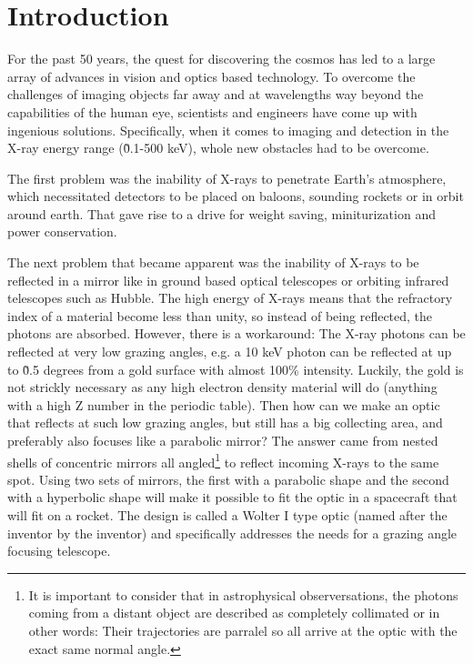 \chapter{Introduction}
For the past 50 years, the quest for discovering the cosmos has led to a large array of advances in vision and optics based technology. To overcome the challenges of imaging objects far away and at wavelengths way beyond the capabilities of the human eye, scientists and engineers have come up with ingenious solutions. Specifically, when it comes to imaging and detection in the X-ray energy range (\~0.1-500 keV), whole new obstacles had to be overcome.

The first problem was the inability of X-rays to penetrate Earth's atmosphere, which necessitated detectors to be placed on baloons, sounding rockets or in orbit around earth. That gave rise to a drive for weight saving, miniturization and power conservation.

The next problem that became apparent was the inability of X-rays to be reflected in a mirror like in ground based optical telescopes or orbiting infrared telescopes such as Hubble. The high energy of X-rays means that the refractory index of a material become less than unity, so instead of being reflected, the photons are absorbed. However, there is a workaround: The X-ray photons can be reflected at very low grazing angles, e.g. a 10 keV photon can be reflected at up to \~0.5 degrees from a gold surface with almost 100\% intensity. Luckily, the gold is not strickly necessary as any high electron density material will do (anything with a high Z number in the periodic table). Then how can we make an optic that reflects at such low grazing angles, but still has a big collecting area, and preferably also focuses like a parabolic mirror? The answer came from nested shells of concentric mirrors all angled\footnote{It is important to consider that in astrophysical observersations, the photons coming from a distant object are described as completely collimated or in other words: Their trajectories are parralel so all arrive at the optic with the exact same normal angle.} to reflect incoming X-rays to the same spot. Using two sets of mirrors, the first with a parabolic shape and the second with a hyperbolic shape will make it possible to fit the optic in a spacecraft that will fit on a rocket. The design is called a Wolter I type optic (named after the inventor by the inventor) and specifically addresses the needs for a grazing angle focusing telescope.

